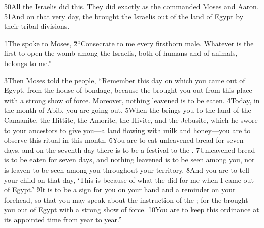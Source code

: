 \v{50}All the Israelis did this. They did exactly as the  commanded Moses and Aaron. \v{51}And on that very day, the  brought the Israelis out of the land of Egypt by their tribal divisions.

\v{1}The  spoke to Moses, \v{2}``Consecrate to me every firstborn male. Whatever is the first to open the womb among the Israelis, both of humans and of animals, belongs to me.''

\v{3}Then Moses told the people, ``Remember this day on which you came out of Egypt, from the house of bondage, because the  brought you out from this place with a strong show of force. Moreover, nothing leavened is to be eaten. \v{4}Today, in the month of Abib, you are going out. \v{5}When the  brings you to the land of the Canaanite, the Hittite, the Amorite, the Hivite, and the Jebusite, which he swore to your ancestors to give you---a land flowing with milk and honey---you are to observe this ritual in this month. \v{6}You are to eat unleavened bread for seven days, and on the seventh day there is to be a festival to the . \v{7}Unleavened bread is to be eaten for seven days, and nothing leavened is to be seen among you, nor is leaven to be seen among you throughout your territory. \v{8}And you are to tell your child on that day, `This is because of what the  did for me when I came out of Egypt.' \v{9}It is to be a sign for you on your hand and a reminder on your forehead, so that you may speak about the instruction of the ; for the  brought you out of Egypt with a strong show of force. \v{10}You are to keep this ordinance at its appointed time from year to year.''

